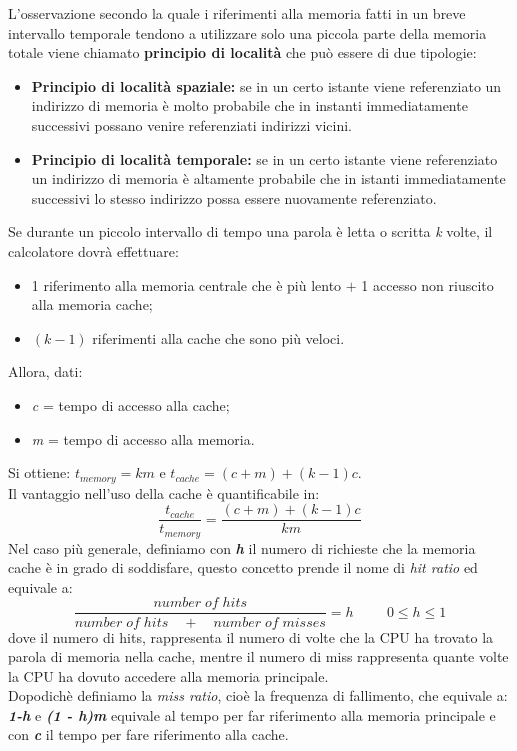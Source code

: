 \documentclass[12pt]{report}
\begin{document}
L'osservazione secondo la quale i riferimenti alla memoria fatti in un breve intervallo temporale tendono a utilizzare solo una piccola parte della memoria totale viene chiamato \textbf{principio di località} che può essere di due tipologie:
\begin{itemize}
	\item \textbf{Principio di località spaziale:} se in un certo istante viene referenziato un indirizzo di memoria è molto probabile che in instanti immediatamente successivi possano venire referenziati indirizzi vicini.
	\item \textbf{Principio di località temporale:} se in un certo istante viene referenziato un indirizzo di memoria è altamente probabile che in istanti immediatamente successivi lo stesso indirizzo possa essere nuovamente referenziato.
\end{itemize}
Se durante un piccolo intervallo di tempo una parola è letta o scritta \textit{k} volte, il calcolatore dovrà effettuare:
\begin{itemize}
	\item 1 riferimento alla memoria centrale che è più lento $+$ 1 accesso non riuscito alla memoria cache;
	\item $(k-1)$ riferimenti alla cache che sono più veloci.
\end{itemize}
Allora, dati:
\begin{itemize}
	\item \textit{c} = tempo di accesso alla cache;
	\item \textit{m} = tempo di accesso alla memoria.
\end{itemize}
Si ottiene: $t_{memory} = km$ e $t_{cache}=(c+m)+(k-1)c$. \\
Il vantaggio nell'uso della cache è quantificabile in:
\[
\dfrac{t_{cache}}{t_{memory}} = \dfrac{(c+m)+(k-1)c}{km}
\]
Nel caso più generale, definiamo con \textbf{\textit{h}} il numero di richieste che la memoria cache è in grado di soddisfare, questo concetto prende il nome di \textit{hit ratio} ed equivale a:
\[
\dfrac{number \; of \; hits}{number \; of \; hits \quad + \quad number \; of \; misses} = h \hspace{1cm} 0 \leq h \leq 1
\]
dove il numero di hits, rappresenta il numero di volte che la CPU ha trovato la parola di memoria nella cache, mentre il numero di miss rappresenta quante volte la CPU ha dovuto accedere alla memoria principale. \\
Dopodichè definiamo la \textit{miss ratio}, cioè la frequenza di fallimento, che equivale a: \textbf{\textit{1-h}} e \textbf{\textit{(1 - h)m}} equivale al tempo per far riferimento alla memoria principale e con \textbf{\textit{c}} il tempo per fare riferimento alla cache. \\
\end{document}
